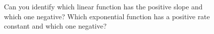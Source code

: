 \documentclass[
  letterpaper,
  DIV=11,
  numbers=noendperiod]{scrreprt}
\begin{document}
\begin{figure}

\begin{minipage}[t]{0.50\linewidth}

{\centering 


}

\end{minipage}%
%
\begin{minipage}[t]{0.50\linewidth}

{\centering 


}

\end{minipage}%

\caption{\label{fig-ch2-funk1}Can you identify which linear function has
the positive slope and which one negative? Which exponential function
has a positive rate constant and which one negative?}

\end{figure}
\end{document}
